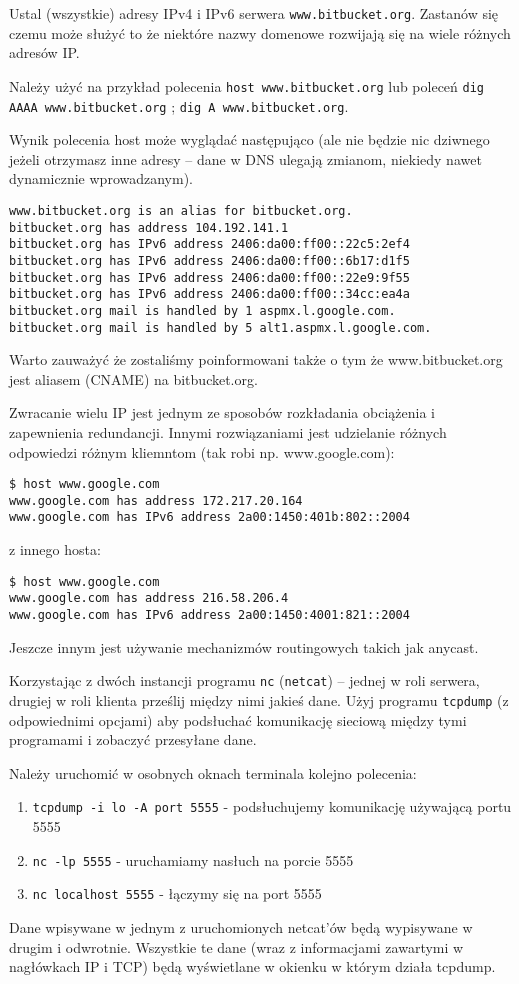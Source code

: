 \dbEntryCheckResults
Ustal (wszystkie) adresy IPv4 i IPv6 serwera \Verb#www.bitbucket.org#.
Zastanów się czemu może służyć to że niektóre nazwy domenowe rozwijają się na wiele różnych adresów IP.
\fi

\dbEntryCheckResults
Należy użyć na przykład polecenia \Verb#host www.bitbucket.org# lub poleceń \Verb#dig AAAA www.bitbucket.org# ; \Verb#dig A www.bitbucket.org#.

Wynik polecenia host może wyglądać następująco (ale nie będzie nic dziwnego jeżeli otrzymasz inne adresy – dane w DNS ulegają zmianom, niekiedy nawet dynamicznie wprowadzanym).
\begin{Verbatim}
www.bitbucket.org is an alias for bitbucket.org.
bitbucket.org has address 104.192.141.1
bitbucket.org has IPv6 address 2406:da00:ff00::22c5:2ef4
bitbucket.org has IPv6 address 2406:da00:ff00::6b17:d1f5
bitbucket.org has IPv6 address 2406:da00:ff00::22e9:9f55
bitbucket.org has IPv6 address 2406:da00:ff00::34cc:ea4a
bitbucket.org mail is handled by 1 aspmx.l.google.com.
bitbucket.org mail is handled by 5 alt1.aspmx.l.google.com.
\end{Verbatim}
Warto zauważyć że zostaliśmy poinformowani także o tym że www.bitbucket.org jest aliasem (CNAME) na bitbucket.org.

Zwracanie wielu IP jest jednym ze sposobów rozkładania obciążenia i zapewnienia redundancji. Innymi rozwiązaniami jest udzielanie różnych odpowiedzi różnym kliemntom (tak robi np. www.google.com):
\begin{Verbatim}
$ host www.google.com
www.google.com has address 172.217.20.164
www.google.com has IPv6 address 2a00:1450:401b:802::2004
\end{Verbatim}
z innego hosta:
\begin{Verbatim}
$ host www.google.com
www.google.com has address 216.58.206.4
www.google.com has IPv6 address 2a00:1450:4001:821::2004
\end{Verbatim}
Jeszcze innym jest używanie mechanizmów routingowych takich jak anycast.
\fi


\dbEntryCheckResults
Korzystając z dwóch instancji programu \Verb#nc# (\Verb#netcat#) – jednej w roli serwera, drugiej w roli klienta prześlij między nimi jakieś dane.
Użyj programu \Verb#tcpdump# (z odpowiednimi opcjami) aby podsłuchać komunikację sieciową między tymi programami i zobaczyć przesyłane dane.
\fi

\dbEntryCheckResults
Należy uruchomić w osobnych oknach terminala kolejno polecenia:
\begin{enumerate}
	\item \Verb#tcpdump -i lo -A port 5555# - podsłuchujemy komunikację używającą portu 5555
	\item \Verb#nc -lp 5555# - uruchamiamy nasłuch na porcie 5555
	\item \Verb#nc localhost 5555# - łączymy się na port 5555
\end{enumerate}
Dane  wpisywane w jednym z uruchomionych netcat'ów będą wypisywane w drugim i odwrotnie.
Wszystkie te dane (wraz z informacjami zawartymi w nagłówkach IP i TCP) będą wyświetlane w okienku w którym działa tcpdump.

